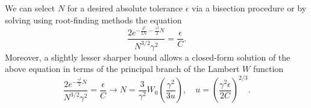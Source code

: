 \documentclass[10pt,a4paper,oneside]{article}
\numberwithin{equation}{section}
\begin{document}
We can select $N$ for a desired absolute tolerance $\epsilon$ via a bisection procedure or by solving using root-finding methods the equation
\begin{equation}
\frac{2 e^{-\frac{\delta^2}{2N} - \frac{\gamma^2}{2}N}}{N^{3/2} \gamma^2} = \frac{\epsilon}{C}.
\end{equation}
Moreover, a slightly lesser sharper bound allows a closed-form solution of the above equation in terms of the principal branch of the Lambert $W$ function \cite[\S 4.13]{NIST:DLMF}
\begin{equation}\label{N_equation}
\frac{2 e^{- \frac{\gamma^2}{2}N}}{N^{3/2} \gamma^2} = \frac{\epsilon}{C} \longrightarrow N = \frac{3}{\gamma^2}W_0\left(\frac{\gamma^2}{3u}\right), \quad u = \left(\frac{\gamma^2 \epsilon}{2 C}\right)^{2/3}.
\end{equation}
\end{document}
